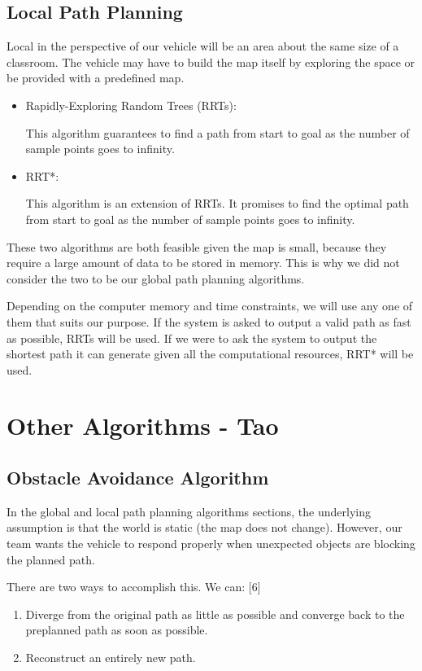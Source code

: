 \documentclass[compsoc,draftclsnofoot,onecolumn,10pt]{IEEEtran}
\begin{document}
\subsection{Local Path Planning}
Local in the perspective of our vehicle will be an area about the same size of a 
classroom. The vehicle may have to build the map itself by exploring the space or 
be provided with a predefined map.\par
\begin{itemize}
\item Rapidly-Exploring Random Trees (RRTs):\par
This algorithm guarantees to find a path from start to goal as the number of 
sample points goes to infinity.
\item RRT*:\par
This algorithm is an extension of RRTs. It promises to find the optimal path from 
start to goal as the number of sample points goes to infinity. 
\end{itemize}
These two algorithms are both feasible given the map is small, because they require 
a large amount of data to be stored in memory. This is why we did not consider the 
two to be our global path planning algorithms.\par

Depending on the computer memory and time constraints, we will use any one of them 
that suits our purpose. If the system is asked to output a valid path as fast as 
possible, RRTs will be used. If we were to ask the system to output the shortest path 
it can generate given all the computational resources, RRT* will be used.\par

\section{Other Algorithms - Tao}
\subsection{Obstacle Avoidance Algorithm}
In the global and local path planning algorithms sections, the underlying assumption 
is that the world is static (the map does not change). However, our team wants the 
vehicle to respond properly when unexpected objects are blocking the planned path.\par 

There are two ways to accomplish this. We can: [6]\par
\begin{enumerate}
\item Diverge from the original path as little as possible and converge back to 
the preplanned path as soon as possible.
\item Reconstruct an entirely new path.
\end{enumerate}
\end{document}
